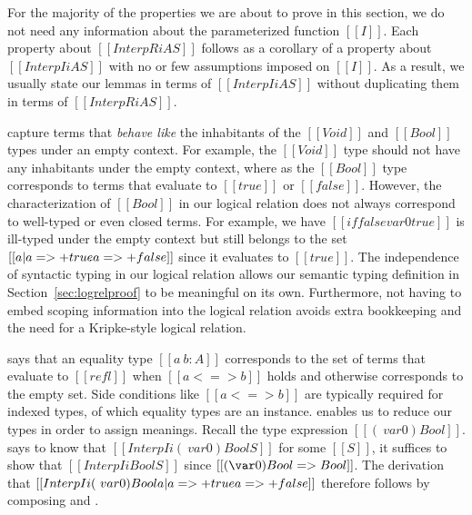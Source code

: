 \documentclass[acmsmall,screen=true,
\ifpublic review=false\else,review=true\fi
  ,anonymous=\ifanonymous true\else false\fi]{acmart}
\newcommand{\yl}[1]{}
\begin{document}


For the majority of the properties we are about to prove in this section, we
do not need any information about the parameterized function $[[I]]$.
Each property about $[[InterpR i A S]]$ follows as a corollary of
a property about $[[Interp I i A S]]$ with no or few assumptions imposed on
$[[I]]$. As a result, we usually state our lemmas in terms of
$[[Interp I i A S]]$ without duplicating them in terms of $[[InterpR i
A S]]$.

 capture terms that \emph{behave like} the inhabitants
of the $[[Void]]$ and $[[Bool]]$ types under an empty context. For
example, the $[[Void]]$ type should not have any inhabitants under the
empty context, where as the $[[Bool]]$ type corresponds to terms that
evaluate to $[[true]]$ or $[[false]]$. However, the characterization
of $[[Bool]]$ in our logical relation does not always correspond to
well-typed or even closed terms. For example, we have $[[if false var 0
true]]$ is ill-typed under the empty context but still belongs to the set $[[{ a | a =>+
  true \/ a =>+ false }]]$ since it evaluates to $[[true]]$.
The independence of syntactic typing in our logical relation allows
our semantic typing definition in Section~\ref{sec:logrelproof} to be
meaningful on its own. Furthermore, not having to embed scoping
information into the logical relation avoids extra bookkeeping and the
need for a Kripke-style logical relation.
\yl{Not sure what to cite from Derek Dreyer. I know his blog post
  about semantic type soundness but is there a good paper to cite? one
of the rust papers?}

says that an equality type $[[a ~ b : A]]$ corresponds to the
set of terms that evaluate to $[[refl]]$ when $[[a <=> b]]$ holds and
otherwise corresponds to the empty set. Side conditions like $[[a <=>
b]]$ are typically required for indexed types, of which equality types
are an instance.  enables us to reduce our types in order
to assign meanings. Recall the type expression $[[(\ var 0)
Bool]]$.  says to know that
$[[Interp I i  (\ var 0) Bool S ]]$ for some $[[S]]$, it suffices to
show that $[[Interp I i Bool S]]$ since $[[(\var 0) Bool =>
Bool]]$. The derivation that $[[Interp I i (\ var 0) Bool { a | a =>+
  true \/ a =>+ false }]]$ therefore follows by composing 
and .
\end{document}
